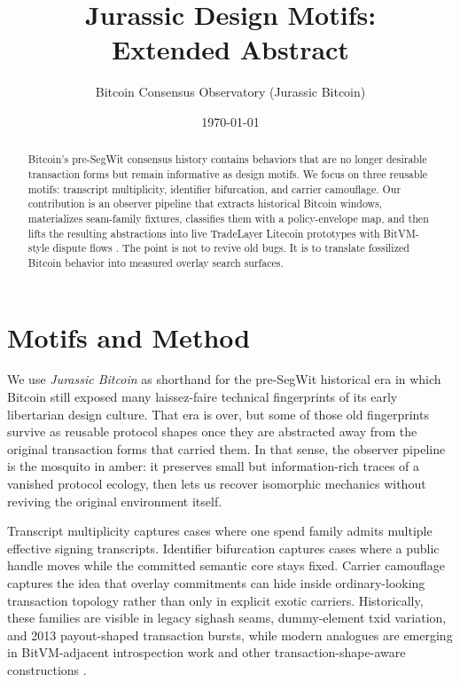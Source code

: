 \documentclass[10pt]{article}
\title{Jurassic Design Motifs:\\
Extended Abstract}
\author{Bitcoin Consensus Observatory (Jurassic Bitcoin)}
\date{\today}
\begin{document}
\maketitle

\begin{abstract}
Bitcoin's pre-SegWit consensus history contains behaviors that are no longer
desirable transaction forms but remain informative as design motifs. We focus
on three reusable motifs: transcript multiplicity, identifier bifurcation, and
carrier camouflage. Our contribution is an observer pipeline that extracts
historical Bitcoin windows, materializes seam-family fixtures, classifies them
with a policy-envelope map, and then lifts the resulting abstractions into live
TradeLayer Litecoin prototypes with BitVM-style dispute flows
\cite{linus2023bitvm,linus2026binohash,yang2021fluffy,kim2025fork}. The point
is not to revive old bugs. It is to translate fossilized Bitcoin behavior into
measured overlay search surfaces.
\end{abstract}

\section*{Motifs and Method}

We use \emph{Jurassic Bitcoin} as shorthand for the pre-SegWit historical era
in which Bitcoin still exposed many laissez-faire technical fingerprints of its
early libertarian design culture. That era is over, but some of those old
fingerprints survive as reusable protocol shapes once they are abstracted away
from the original transaction forms that carried them. In that sense, the
observer pipeline is the mosquito in amber: it preserves small but
information-rich traces of a vanished protocol ecology, then lets us recover
isomorphic mechanics without reviving the original environment itself.

Transcript multiplicity captures cases where one spend family admits multiple
effective signing transcripts. Identifier bifurcation captures cases where a
public handle moves while the committed semantic core stays fixed. Carrier
camouflage captures the idea that overlay commitments can hide inside
ordinary-looking transaction topology rather than only in explicit exotic
carriers. Historically, these families are visible in legacy sighash seams,
dummy-element txid variation, and 2013 payout-shaped transaction bursts, while
modern analogues are emerging in BitVM-adjacent introspection work and other
transaction-shape-aware constructions \cite{linus2026binohash,andrychowicz2013malleability,decker2014malleability,ghesmati2022payjoin}.
\end{document}
